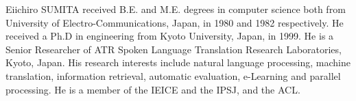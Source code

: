 \begin{biography}
{
Eiichiro SUMITA received B.E. and M.E. degrees in computer science both
from University of Electro-Communications, Japan,  in 1980 and 1982
respectively.
He received  a Ph.D in engineering from Kyoto University, Japan, in 1999.
He is a Senior Researcher of ATR Spoken Language Translation Research
Laboratories, Kyoto, Japan.
His research interests include natural language processing, machine
translation,
information retrieval, automatic evaluation, e-Learning and parallel
processing.
He is a member of the IEICE and the IPSJ, and the ACL.
}


\end{biography}



